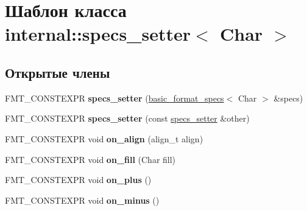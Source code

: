 \hypertarget{classinternal_1_1specs__setter}{}\section{Шаблон класса internal\+:\+:specs\+\_\+setter$<$ Char $>$}
\label{classinternal_1_1specs__setter}
\subsection*{Открытые члены}
\begin{DoxyCompactItemize}
\item 
\mbox{\label{classinternal_1_1specs__setter_a36afda80a8421700e9293a4271bea4ea}} 
F\+M\+T\+\_\+\+C\+O\+N\+S\+T\+E\+X\+PR {\bfseries specs\+\_\+setter} (\hyperlink{structbasic__format__specs}{basic\+\_\+format\+\_\+specs}$<$ Char $>$ \&specs)
\item 
\mbox{\label{classinternal_1_1specs__setter_a2fc19308b1c3c83c5eea29975b12c9b9}} 
F\+M\+T\+\_\+\+C\+O\+N\+S\+T\+E\+X\+PR {\bfseries specs\+\_\+setter} (const \hyperlink{classinternal_1_1specs__setter}{specs\+\_\+setter} \&other)
\item 
\mbox{\label{classinternal_1_1specs__setter_ac77ea6c2630c5fdedbdf84a70a84ee07}} 
F\+M\+T\+\_\+\+C\+O\+N\+S\+T\+E\+X\+PR void {\bfseries on\+\_\+align} (align\+\_\+t align)
\item 
\mbox{\label{classinternal_1_1specs__setter_a9b55facc3431eafc99a184eb6edba152}} 
F\+M\+T\+\_\+\+C\+O\+N\+S\+T\+E\+X\+PR void {\bfseries on\+\_\+fill} (Char fill)
\item 
\mbox{\label{classinternal_1_1specs__setter_a6e7d9ebef267e0dc2b97d6eb2f16b8c4}} 
F\+M\+T\+\_\+\+C\+O\+N\+S\+T\+E\+X\+PR void {\bfseries on\+\_\+plus} ()
\item 
\mbox{\label{classinternal_1_1specs__setter_a757602c824fafe82d1b85843dd8193c1}} 
F\+M\+T\+\_\+\+C\+O\+N\+S\+T\+E\+X\+PR void {\bfseries on\+\_\+minus} ()
\item 
\mbox{\label{classinternal_1_1specs__setter_a86dccb217e6fff587efff19c7717de04}} 

\end{DoxyCompactItemize}
